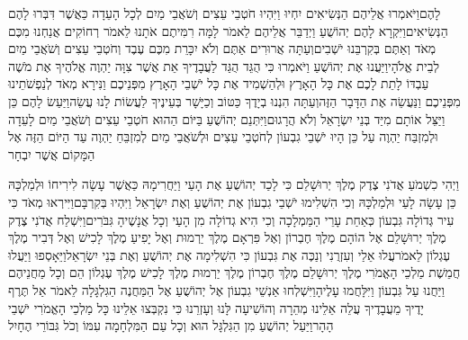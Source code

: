\documentclass[../main/main.tex]{subfiles}
\begin{document}
\begin{multicols*}{\ncols}
לָהֶם\PreVerseSpace{}וַיֹּאמְרוּ אֲלֵיהֶם הַנְּשִׂיאִים יִחְיוּ וַיִּהְיוּ חֹטְבֵי עֵצִים וְשֹׁאֲבֵי מַיִם לְכָל הָעֵדָה כַּאֲשֶׁר דִּבְּרוּ לָהֶם הַנְּשִׂיאִים\PreVerseSpace{}וַיִּקְרָא לָהֶם יְהוֹשֻׁעַ וַיְדַבֵּר אֲלֵיהֶם לֵאמֹר לָמָּה רִמִּיתֶם אֹתָנוּ לֵאמֹר רְחוֹקִים אֲנַחְנוּ מִכֶּם מְאֹד וְאַתֶּם בְּקִרְבֵּנוּ יֹשְׁבִים\PreVerseSpace{}וְעַתָּה אֲרוּרִים אַתֶּם וְלֹא יִכָּרֵת מִכֶּם עֶבֶד וְחֹטְבֵי עֵצִים וְשֹׁאֲבֵי מַיִם לְבֵית אֱלֹהָי\PreVerseSpace{}וַיַּעֲנוּ אֶת יְהוֹשֻׁעַ וַיֹּאמְרוּ כִּי הֻגֵּד הֻגַּד לַעֲבָדֶיךָ אֵת אֲשֶׁר צִוָּה יַהְוֶה אֱלֹהֶיךָ אֶת מֹשֶׁה עַבְדּוֹ לָתֵת לָכֶם אֶת כָּל הָאָרֶץ וּלְהַשְׁמִיד אֶת כָּל יֹשְׁבֵי הָאָרֶץ מִפְּנֵיכֶם וַנִּירָא מְאֹד לְנַפְשֹׁתֵינוּ מִפְּנֵיכֶם וַנַּעֲשֵׂה אֶת הַדָּבָר הַזֶּה\PreVerseSpace{}וְעַתָּה הִנְנוּ בְיָדֶךָ כַּטּוֹב וְכַיָּשָׁר בְּעֵינֶיךָ לַעֲשׂוֹת לָנוּ עֲשֵׂה\PreVerseSpace{}וַיַּעַשׂ לָהֶם כֵּן וַיַּצֵּל אוֹתָם מִיַּד בְּנֵי יִשְׂרָאֵל וְלֹא הֲרָגוּם\PreVerseSpace{}וַיִּתְּנֵם יְהוֹשֻׁעַ בַּיּוֹם הַהוּא חֹטְבֵי עֵצִים וְשֹׁאֲבֵי מַיִם לָעֵדָה וּלְמִזְבַּח יַהְוֶה עַל כֵּן הָיוּ יֹשְׁבֵי גִבְעוֹן לְחֹטְבֵי עֵצִים וּלְשֹׁאֲבֵי מַיִם לְמִזְבֵּחַ יַהְוֶה\OmitEnd{} עַד הַיּוֹם הַזֶּה אֶל הַמָּקוֹם אֲשֶׁר יִבְחָר\OpenSection{}\par
{}וַיְהִי כִשְׁמֹעַ אֲדֹנִי צֶדֶק מֶלֶךְ יְרוּשָׁלֵם כִּי לָכַד יְהוֹשֻׁעַ אֶת הָעַי וַיַּחֲרִימָהּ כַּאֲשֶׁר עָשָׂה לִירִיחוֹ וּלְמַלְכָּהּ כֵּן עָשָׂה לָעַי וּלְמַלְכָּהּ וְכִי הִשְׁלִימוּ יֹשְׁבֵי גִבְעוֹן אֶת יְהוֹשֻׁעַ וְאֶת\OmitEnd{} יִשְׂרָאֵל וַיִּהְיוּ בְּקִרְבָּם\PreVerseSpace{}וַיִּירְאוּ מְאֹד כִּי עִיר גְּדוֹלָה גִּבְעוֹן כְּאַחַת עָרֵי הַמַּמְלָכָה וְכִי הִיא גְדוֹלָה מִן הָעַי וְכָל אֲנָשֶׁיהָ גִּבֹּרִים\PreVerseSpace{}וַיִּשְׁלַח אֲדֹנִי צֶדֶק מֶלֶךְ יְרוּשָׁלֵם אֶל הוֹהָם מֶלֶךְ חֶבְרוֹן וְאֶל פִּרְאָם מֶלֶךְ יַרְמוּת וְאֶל יָפִיעַ מֶלֶךְ לָכִישׁ וְאֶל דְּבִיר מֶלֶךְ עֶגְלוֹן לֵאמֹר\PreVerseSpace{}עֲלוּ אֵלַי וְעִזְרֻנִי וְנַכֶּה אֶת גִּבְעוֹן כִּי הִשְׁלִימָה אֶת יְהוֹשֻׁעַ וְאֶת בְּנֵי יִשְׂרָאֵל\PreVerseSpace{}וַיֵּאָסְפוּ וַיַּעֲלוּ חֲמֵשֶׁת מַלְכֵי הָאֱמֹרִי מֶלֶךְ יְרוּשָׁלֵם מֶלֶךְ חֶבְרוֹן מֶלֶךְ יַרְמוּת מֶלֶךְ לָכִישׁ מֶלֶךְ עֶגְלוֹן הֵם וְכָל מַחֲנֵיהֶם וַיַּחֲנוּ עַל גִּבְעוֹן וַיִּלָּחֲמוּ עָלֶיהָ\PreVerseSpace{}וַיִּשְׁלְחוּ אַנְשֵׁי גִבְעוֹן אֶל יְהוֹשֻׁעַ אֶל הַמַּחֲנֶה הַגִּלְגָּלָה לֵאמֹר אַל תֶּרֶף יָדֶיךָ מֵעֲבָדֶיךָ עֲלֵה אֵלֵינוּ מְהֵרָה וְהוֹשִׁיעָה לָּנוּ וְעָזְרֵנוּ כִּי נִקְבְּצוּ אֵלֵינוּ כָּל מַלְכֵי הָאֱמֹרִי יֹשְׁבֵי הָהָר\PreVerseSpace{}וַיַּעַל יְהוֹשֻׁעַ מִן הַגִּלְגָּל הוּא וְכָל עַם הַמִּלְחָמָה עִמּוֹ וְכֹל גִּבּוֹרֵי הֶחָיִל\OpenSection{}\par

\end{multicols*}
\end{document}
